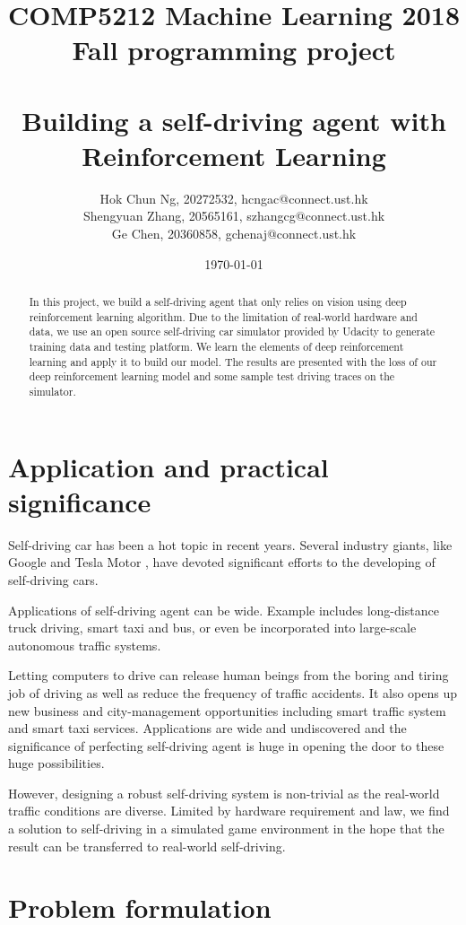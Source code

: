 \documentclass[a4paper]{article}
\title{COMP5212 Machine Learning 2018 Fall programming project \\
       \ \ \ \ \\
       Building a self-driving agent with Reinforcement Learning}
\author{Hok Chun Ng, 20272532, hcngac@connect.ust.hk \\
        Shengyuan Zhang, 20565161, szhangcg@connect.ust.hk \\
        Ge Chen, 20360858, gchenaj@connect.ust.hk}
\date{\today}
\begin{document}
\maketitle

\begin{abstract}
In this project, we build a self-driving agent that only relies on vision using deep reinforcement
learning algorithm. Due to the limitation of real-world hardware and data, we use an open
source self-driving
car simulator provided by Udacity \cite{simulator} to generate training data and testing platform.
We learn the elements of deep reinforcement learning and apply it to build our model. The results are
presented with the loss of our deep reinforcement learning model and some sample test driving traces
on the simulator.
\end{abstract}

\section{Application and practical significance}

Self-driving car has been a hot topic in recent years. Several industry giants, like Google
\cite{google} and Tesla Motor \cite{tesla}, have devoted significant efforts to the developing of
self-driving cars. 

Applications of self-driving agent can be wide. Example includes long-distance truck driving,
smart taxi and bus, or even be incorporated into large-scale autonomous traffic systems.

Letting computers to drive can release human beings from the boring and tiring job of driving as
well as reduce the frequency of traffic accidents. It also opens up new business and
city-management opportunities including smart traffic system and smart taxi services.
Applications are wide and undiscovered and the significance of perfecting self-driving agent is
huge in opening the door to these huge possibilities.

However, designing a robust self-driving system is non-trivial as the real-world traffic
conditions are diverse. Limited by hardware requirement and law, we find a solution to
self-driving in a simulated game environment in the hope that the result can be transferred to
real-world self-driving.


\section{Problem formulation}
\end{document}

